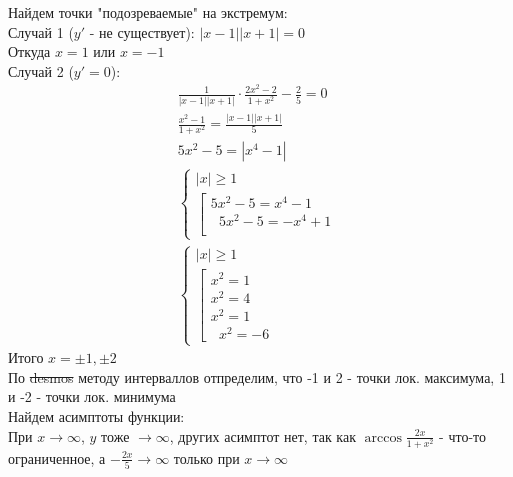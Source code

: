 \begin{enumerate}
    Найдем точки "подозреваемые" на экстремум: \\
    Случай 1 ($y'$ - не существует): 
    $|x-1||x+1|=0$\\
    Откуда $x = 1$ или $x = -1$\\
    Случай 2 ($y'=0$):\\
    \begin{gather*}
    \frac{1}{|x-1||x+1|}\cdot\frac{2x^2 -2}{1+x^2}-\frac{2}{5}=0 \\
    \frac{x^2 -1}{1+x^2}=\frac{|x-1||x+1|}{5} \\
    5x^2 -5=|x^4-1| \\
    \begin{cases}
        |x| \geq 1 \\
        \left[
        \begin{gathered} 
            5x^2 -5 = x^4 -1 \\
            \hspace{7pt} 5x^2 -5 = -x^4 +1 \\
        \end{gathered} 
        \right.
    \end{cases} \\
    \begin{cases}
        |x| \geq 1 \\
        \left[
        \begin{gathered} 
            x^2=1 \\
            x^2=4\\
            x^2=1\\
            \hspace{7pt} x^2=-6
        \end{gathered} 
        \right.
    \end{cases} 
    \end{gather*}
    Итого $x=\pm 1,\pm 2$ \\
    По \sout{desmos} методу интерваллов отпределим, что -1 и 2 - точки лок. максимума, 1 и -2 - точки лок. минимума \\
    Найдем асимптоты функции: \\
    При $x\rightarrow \infty$, $y$ тоже $\rightarrow \infty$, других асимптот нет, так как $\arccos{\frac{2x}{1+x^2}}$ - что-то ограниченное, а $-\frac{2x}{5}\rightarrow \infty$ только при $x\rightarrow \infty$\\

\end{enumerate}
